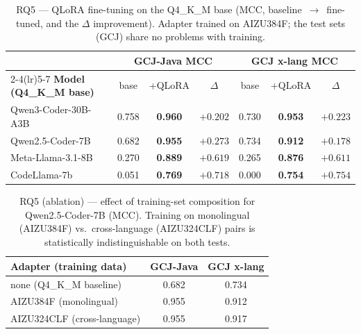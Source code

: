 \documentclass[11pt]{article}
\newcommand{\best}[1]{\textbf{#1}}
\begin{document}
\begin{table}[htbp]
  \centering
  \caption{RQ5 --- QLoRA fine-tuning on the Q4\_K\_M base (MCC,
           baseline~$\rightarrow$~fine-tuned, and the $\Delta$ improvement).
           Adapter trained on AIZU384F; the test sets (GCJ) share no problems
           with training.}
  \label{tab:rq5}
  \small
  \begin{tabular}{lcccccc}
    \toprule
    & \multicolumn{3}{c}{\textbf{GCJ-Java MCC}} & \multicolumn{3}{c}{\textbf{GCJ x-lang MCC}}\\
    \cmidrule(lr){2-4}\cmidrule(lr){5-7}
    \textbf{Model (Q4\_K\_M base)} & base & +QLoRA & $\Delta$ & base & +QLoRA & $\Delta$ \\
    \midrule
    Qwen3-Coder-30B-A3B & 0.758 & \best{0.960} & $+0.202$ & 0.730 & \best{0.953} & $+0.223$ \\
    Qwen2.5-Coder-7B  & 0.682 & \best{0.955} & $+0.273$ & 0.734 & \best{0.912} & $+0.178$ \\
    Meta-Llama-3.1-8B & 0.270 & \best{0.889} & $+0.619$ & 0.265 & \best{0.876} & $+0.611$ \\
    CodeLlama-7b      & 0.051 & \best{0.769} & $+0.718$ & 0.000 & \best{0.754} & $+0.754$ \\
    \bottomrule
  \end{tabular}
\end{table}

\begin{table}[htbp]
  \centering
  \caption{RQ5 (ablation) --- effect of training-set composition for Qwen2.5-Coder-7B
           (MCC). Training on monolingual (AIZU384F) vs.\ cross-language
           (AIZU324CLF) pairs is statistically indistinguishable on both tests.}
  \label{tab:rq5-ablation}
  \small
  \begin{tabular}{lcc}
    \toprule
    \textbf{Adapter (training data)} & \textbf{GCJ-Java} & \textbf{GCJ x-lang} \\
    \midrule
    none (Q4\_K\_M baseline)       & 0.682 & 0.734 \\
    AIZU384F (monolingual)         & 0.955 & 0.912 \\
    AIZU324CLF (cross-language)    & 0.955 & 0.917 \\
    \bottomrule
  \end{tabular}
\end{table}
\end{document}
